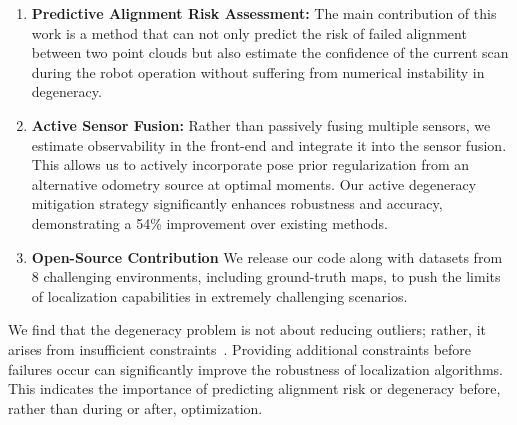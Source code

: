 \begin{enumerate}
    \item \textbf{Predictive Alignment Risk Assessment:} The main contribution of this work is a method that can not only predict the risk of failed alignment between two point clouds but also estimate the confidence of the current scan during the robot operation without suffering from numerical instability in degeneracy.
    \item \textbf{Active Sensor Fusion:} Rather than passively fusing multiple sensors, we estimate observability in the front-end and integrate it into the sensor fusion. This allows us to actively incorporate pose prior regularization from an alternative odometry source at optimal moments. Our active degeneracy mitigation strategy significantly enhances robustness and accuracy, demonstrating a 54\% improvement over existing methods.


    
    
    \item \textbf{Open-Source Contribution} We release our code along with datasets from 8 challenging environments, including ground-truth maps, to push the limits of localization capabilities in extremely challenging scenarios.

\end{enumerate}
We find that the degeneracy problem is not about reducing outliers; rather, it arises from insufficient constraints~\cite{tuna23xicp, tuna24informed}. Providing additional constraints before failures occur can significantly improve the robustness of localization algorithms. This indicates the importance of predicting alignment risk or degeneracy before, rather than during or after, optimization.

